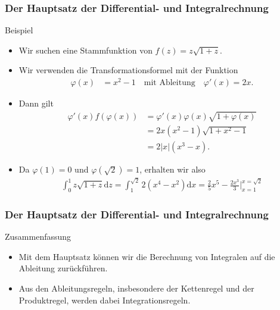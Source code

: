 \documentclass{beamer}
\newcommand\dd{\mathrm d}
\renewcommand{\oe}{\"o}
\newcommand{\ue}{\"u}
\newcommand{\mytitle}{Der Hauptsatz der Differential- und Integralrechnung}
\begin{document}
\begin{frame}\frametitle{\mytitle}
	\begin{block}{Beispiel}
	\begin{itemize}
		\item Wir suchen eine Stammfunktion von $f(z)=z\sqrt{1+z}$.
		\item Wir verwenden die Transformationsformel mit der Funktion
			\begin{align*}
				\varphi(x)&=x^2-1\quad\mbox{mit Ableitung}\quad\varphi'(x)=2x.
			\end{align*}
		\item Dann gilt
			\begin{align*}
				\varphi'(x)f(\varphi(x))&=\varphi'(x)\varphi(x)\sqrt{1+\varphi(x)}\\
										&=2x(x^2-1)\sqrt{1+x^2-1}\\
										&=2|x|(x^3-x).
			\end{align*}
		\item Da $\varphi(1)=0$ und $\varphi(\sqrt 2)=1$, erhalten wir also
			\begin{align*}
				\int_0^1z\sqrt{1+z}\dd z=\int_1^{\sqrt 2}2(x^4-x^2)\dd x
				=\frac{2}{5}x^5-\frac{2x^3}{3}\bigg|_{x=1}^{x=\sqrt 2}
			\end{align*}
	\end{itemize}
	\end{block}
\end{frame}

\begin{frame}\frametitle{\mytitle}
	\begin{block}{Zusammenfassung}
	\begin{itemize}
		\item Mit dem Hauptsatz k\oe nnen wir die Berechnung von Integralen auf die Ableitung zur\ue ckf\ue hren.
		\item Aus den Ableitungsregeln, insbesondere der Kettenregel und der Produktregel, werden dabei Integrationsregeln.
	\end{itemize}
	\end{block}
\end{frame}
\end{document}
